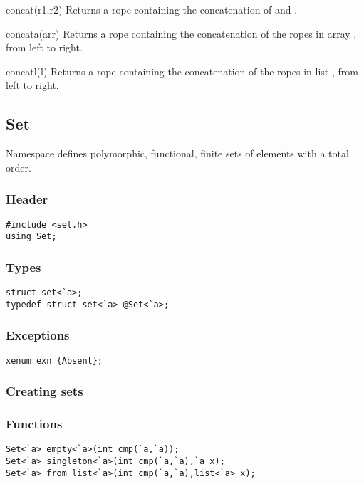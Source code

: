 \begin{defun}{concat}{(r1,r2)}
Returns a rope containing the concatenation of  and .
\end{defun}

\begin{defun}{concata}{(arr)}
Returns a rope containing the concatenation of the ropes in array
, from left to right.
\end{defun}

\begin{defun}{concatl}{(l)}
Returns a rope containing the concatenation of the ropes in list
, from left to right.
\end{defun}

\subsection{Set}

Namespace  defines polymorphic, functional, finite sets of
elements with a total order.

\subsubsection*{Header}
\begin{verbatim}
#include <set.h>
using Set;
\end{verbatim}

\subsubsection*{Types}
\begin{verbatim}
struct set<`a>;
typedef struct set<`a> @Set<`a>;
\end{verbatim}

\subsubsection*{Exceptions}
\begin{verbatim}
xenum exn {Absent};
\end{verbatim}

\subsubsection*{Creating sets}

\subsubsection*{Functions}
\begin{verbatim}
Set<`a> empty<`a>(int cmp(`a,`a));
Set<`a> singleton<`a>(int cmp(`a,`a),`a x);
Set<`a> from_list<`a>(int cmp(`a,`a),list<`a> x);
\end{verbatim}


